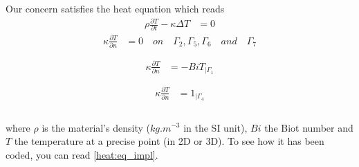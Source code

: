 Our concern satisfies the heat equation which reads 
\begin{equation}
   \begin{split}
      \displaystyle{\rho \frac{ \partial T}{\partial t}}  -  \kappa \Delta T & = 0
  \end{split}
\end{equation}
\begin{equation}
\label{hom_neu}
   \begin{split}
      \displaystyle{ \kappa \frac{\partial T}{\partial n}} & =  0 \quad on \quad \Gamma_2,\Gamma_5, \Gamma_6 \quad and \quad \Gamma_7 \\ \\ 
  \end{split}
\end{equation}
\begin{equation}
\label{classic_neu}
   \begin{split}
      \displaystyle{ \kappa \frac{\partial T}{\partial n}} & = - Bi T_{ | \Gamma_1 } \\ \\
  \end{split}
\end{equation}
\begin{equation}
\label{nonhom_neu}
   \begin{split}
      \displaystyle{ \kappa \frac{\partial T}{\partial n}} & =  1_{| \Gamma_4} \\ \\
  \end{split}
\end{equation}

where $\rho$ is the material's density ($kg.m^{-3}$ in the SI unit), $Bi$ the Biot number and $T$ the temperature at a precise point (in 2D or 3D). To see how it has been coded, you can read \ref{heat:eq_impl}.

%



